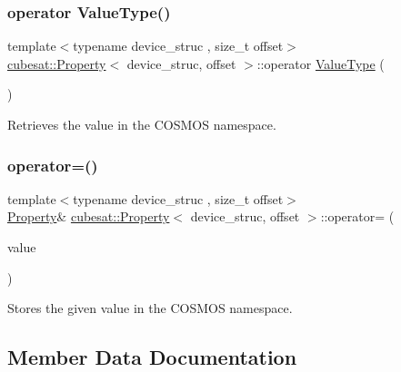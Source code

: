 \subsubsection{\texorpdfstring{operator Value\+Type()}{operator ValueType()}}
{\footnotesize\ttfamily template$<$typename device\+\_\+struc , size\+\_\+t offset$>$ \\
\hyperlink{structcubesat_1_1Property}{cubesat\+::\+Property}$<$ device\+\_\+struc, offset $>$\+::operator \hyperlink{structcubesat_1_1Property_a24aaec6241faac15f50c63bb6c972fd4}{Value\+Type} (\begin{DoxyParamCaption}{ }\end{DoxyParamCaption})\hspace{0.3cm}{\ttfamily [inline]}}



Retrieves the value in the C\+O\+S\+M\+OS namespace. 

\mbox{\label{structcubesat_1_1Property_a5aa93e37bf7adaa56ac3a9fba407e12c}} 
\subsubsection{\texorpdfstring{operator=()}{operator=()}}
{\footnotesize\ttfamily template$<$typename device\+\_\+struc , size\+\_\+t offset$>$ \\
\hyperlink{structcubesat_1_1Property}{Property}\& \hyperlink{structcubesat_1_1Property}{cubesat\+::\+Property}$<$ device\+\_\+struc, offset $>$\+::operator= (\begin{DoxyParamCaption}\item[{\hyperlink{structcubesat_1_1Property_a24aaec6241faac15f50c63bb6c972fd4}{Value\+Type}}]{value }\end{DoxyParamCaption})\hspace{0.3cm}{\ttfamily [inline]}}



Stores the given value in the C\+O\+S\+M\+OS namespace. 



\subsection{Member Data Documentation}
\mbox{\label{structcubesat_1_1Property_a04415356b5a01900753d1fb26987ace8}} 
